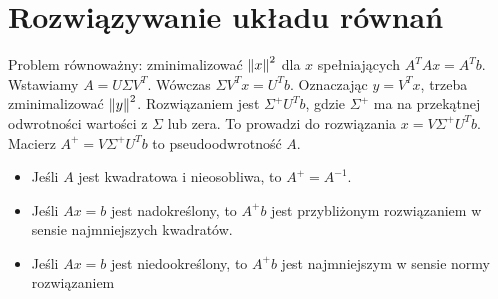\section{Rozwiązywanie układu równań}
Problem równoważny: zminimalizować \( \left\Vert x \right\Vert^2 \) dla \( x \) spełniających \( A^TAx = A^Tb \). \\
Wstawiamy \( A = U\Sigma V^T \). Wówczas \( \Sigma V^Tx = U^Tb \). Oznaczając \( y = V^Tx \), trzeba zminimalizować \( \left\Vert y \right\Vert^2 \). Rozwiązaniem jest \( \Sigma^+U^Tb \), gdzie \( \Sigma^+ \) ma na przekątnej odwrotności wartości z \( \Sigma \) lub zera. To prowadzi do rozwiązania \( x = V\Sigma^+U^Tb \). Macierz \( A^+ = V\Sigma^+U^Tb \) to pseudoodwrotność \( A \).
\begin{itemize}
	\onehalfspacing
	\item Jeśli \( A \) jest kwadratowa i nieosobliwa, to \( A^+ = A^{-1} \).
	\item Jeśli \( Ax = b \) jest nadokreślony, to \( A^+b \) jest przybliżonym rozwiązaniem w sensie najmniejszych kwadratów.
	\item Jeśli \( Ax = b \) jest niedookreślony, to \( A^+b \) jest najmniejszym w sensie normy rozwiązaniem
\end{itemize}